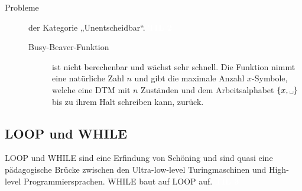 \documentclass[a4paper,10pt]{article}
\newcommand{\vl}[1]{\colorbox{vl}{\textcolor{white}{\small\textbf{#1}}}}
\newcommand{\blank}{\text{\textvisiblespace}}
\begin{document}
\begin{description}
        \item[Probleme] der Kategorie „Unentscheidbar“. \vl{TIL 2}
            \begin{description}
                \item[Busy-Beaver-Funktion] ist nicht berechenbar und wächst sehr schnell. Die Funktion nimmt eine natürliche Zahl $n$ und gibt die maximale Anzahl $x$-Symbole, welche eine DTM mit $n$ Zuständen und dem Arbeitsalphabet $\{x,\blank\}$ bis zu ihrem Halt schreiben kann, zurück.
            \end{description}
    \end{description}


    \subsection{LOOP und WHILE}
    LOOP und WHILE sind eine Erfindung von Schöning und sind quasi eine pädagogische Brücke zwischen den Ultra-low-level Turingmaschinen und High-level Programmiersprachen. WHILE baut auf LOOP auf. \vl{TIL 3}
\end{document}
